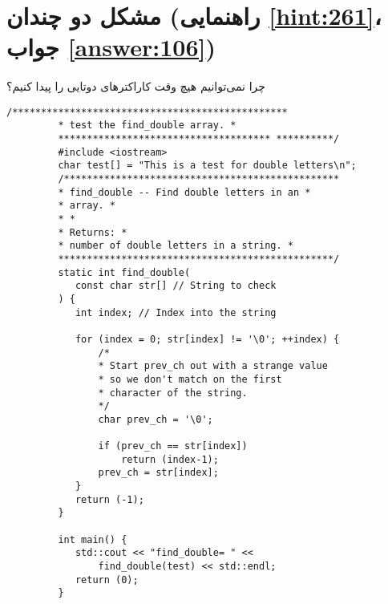 \section[مشکل دو چندان]{مشکل دو چندان \protect{} (راهنمایی \ref{hint:261}، جواب \ref{answer:106})}
\paragraph{}\label{prog:32}
چرا نمی‌توانیم هیچ وقت کاراکترهای دوتایی را پیدا کنیم؟

\begin{LTR}
    \begin{lstlisting}[style=C++Style]
         /************************************************
         * test the find_double array. *
         ************************************* **********/
         #include <iostream>
         char test[] = "This is a test for double letters\n";
         /************************************************
         * find_double -- Find double letters in an *
         * array. *
         * *
         * Returns: *
         * number of double letters in a string. *
         ************************************************/
         static int find_double(
         	const char str[] // String to check
         ) {
         	int index; // Index into the string

         	for (index = 0; str[index] != '\0'; ++index) {
         		/*
         		* Start prev_ch out with a strange value
         		* so we don't match on the first
         		* character of the string.
         		*/
         		char prev_ch = '\0';

         		if (prev_ch == str[index])
         			return (index-1);
         		prev_ch = str[index];
         	}
         	return (-1);
         }

         int main() {
         	std::cout << "find_double= " <<
         		find_double(test) << std::endl;
         	return (0);
         }
    \end{lstlisting}
\end{LTR}